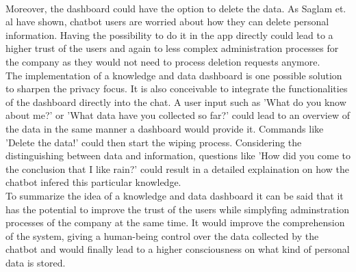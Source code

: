 \documentclass[sigconf, nonacm]{acmart}
\begin{document}
\\
Moreover, the dashboard could have the option to delete the data. As Saglam et. al \cite{Saglam2021} have shown, chatbot users are worried about how they can delete personal information. Having the possibility to do it in the app directly could lead to a higher trust of the users and again to less complex administration processes for the company
as they would not need to process deletion requests anymore.
\\
The implementation of a knowledge and data dashboard is one possible solution to sharpen the privacy focus. It is also conceivable to integrate the functionalities of the dashboard directly into the chat.
A user input such as 'What do you know about me?' or 'What data have you collected so far?' could lead to an overview of the data in the same manner a dashboard would provide it.
Commands like 'Delete the data!' could then start the wiping process. 
Considering the distinguishing between data and information, questions like 'How did you come to the conclusion that I like rain?' could result in a detailed explaination on how the chatbot infered this particular knowledge.
\\
To summarize the idea of a knowledge and data dashboard it can be said that it has the potential to improve the trust of the users while simplyfing adminstration processes of the company at the same time. 
It would improve the comprehension of the system, giving a human-being control over the data collected by the chatbot and would finally lead to a higher consciousness on what kind of personal data is stored.
\end{document}
